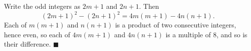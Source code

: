 Write the odd integers as $2m+1$ and $2n+1$. Then
\[(2m+1)^2-(2n+1)^2=4m(m+1)-4n(n+1).\]
Each of $m(m+1)$ and $n(n+1)$ is a product of two consecutive integers, hence even, so each of $4m(m+1)$ and $4n(n+1)$ is a multiple of $8$, and so is their difference. $\blacksquare$
